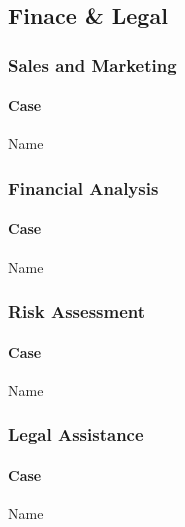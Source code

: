 \documentclass[fleqn,10pt]{SelfArx} %
\begin{document}
\subsection{Finace \& Legal}

\subsubsection{Sales and Marketing}
\paragraph{Case} Name %

\subsubsection{Financial Analysis}
\paragraph{Case} Name %

\subsubsection{Risk Assessment}
\paragraph{Case} Name %

\subsubsection{Legal Assistance}
\paragraph{Case} Name %



\end{document}
